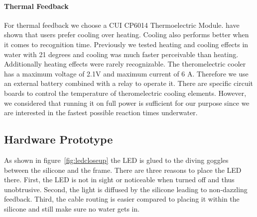 \paragraph{Thermal Feedback}

For thermal feedback we choose a CUI CP6014 Thermoelectric Module. 
\cite{Peiris_thermoVR} have shown that users prefer cooling over heating.
Cooling also performs better when it comes to recognition time.
Previously we tested heating and cooling effects in water with 21 degrees and cooling was much faster perceivable than heating.
Additionally heating effects were rarely recognizable.
The theromelectric cooler has a maximum voltage of 2.1V and maximum current of 6 A.
Therefore we use an external battery combined with a relay to operate it.
There are specific circuit boards to control the temperature of theromelectric cooling elements.
However, we considered that running it on full power is sufficient for our purpose since we are interested in the fastest possible reaction times underwater.


\subsection{Hardware Prototype}

As shown in figure~\ref{fig:ledcloseup} the LED is glued to the diving goggles between the silicone and the frame.
There are three reasons to place the LED there.
First, the LED is not in sight or noticeable when turned off and thus unobtrusive.
Second, the light is diffused by the silicone leading to non-dazzling feedback.
Third, the cable routing is easier compared to placing it within the silicone and still make sure no water gets in.

